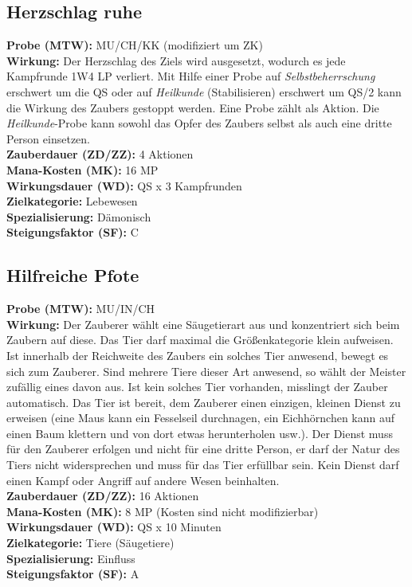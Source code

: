 \subsection{Herzschlag ruhe}
\label{chap:herzschlag_ruhe}
\textbf{Probe (MTW):} MU/CH/KK (modifiziert um ZK) \\
\textbf{Wirkung:} Der Herzschlag des Ziels wird ausgesetzt, wodurch es jede Kampfrunde 1W4 LP verliert. Mit Hilfe einer Probe auf \textit{Selbstbeherrschung} erschwert um die QS oder auf \textit{Heilkunde} (Stabilisieren) erschwert um QS/2 kann die Wirkung des Zaubers gestoppt werden. Eine Probe zählt als Aktion. Die \textit{Heilkunde}-Probe kann sowohl das Opfer des Zaubers selbst als auch eine dritte Person einsetzen.\\
\textbf{Zauberdauer (ZD/ZZ):} 4 Aktionen \\
\textbf{Mana-Kosten (MK):} 16 MP \\
\textbf{Wirkungsdauer (WD):} QS x 3 Kampfrunden \\
\textbf{Zielkategorie:} Lebewesen \\
\textbf{Spezialisierung:} Dämonisch \\
\textbf{Steigungsfaktor (SF):} C


\subsection{Hilfreiche Pfote}
\label{chap:hilfreiche_pfote}
\textbf{Probe (MTW):} MU/IN/CH \\
\textbf{Wirkung:} Der Zauberer wählt eine Säugetierart aus und konzentriert sich beim Zaubern auf diese. Das Tier darf maximal die Größenkategorie klein aufweisen. Ist innerhalb der Reichweite des Zaubers ein solches Tier anwesend, bewegt es sich zum Zauberer. Sind mehrere Tiere dieser Art anwesend, so wählt der Meister zufällig eines davon aus. Ist kein solches Tier vorhanden, misslingt der Zauber automatisch. Das Tier ist bereit, dem Zauberer einen einzigen, kleinen Dienst zu erweisen (eine Maus kann ein Fesselseil durchnagen, ein Eichhörnchen kann auf einen Baum klettern und von dort etwas herunterholen usw.). Der Dienst muss für den Zauberer erfolgen und nicht für eine dritte Person, er darf der Natur des Tiers nicht widersprechen und muss für das Tier erfüllbar sein. Kein Dienst darf einen Kampf oder Angriff auf andere Wesen beinhalten.\\
\textbf{Zauberdauer (ZD/ZZ):} 16 Aktionen \\
\textbf{Mana-Kosten (MK):} 8 MP (Kosten sind nicht modifizierbar) \\
\textbf{Wirkungsdauer (WD):} QS x 10 Minuten \\
\textbf{Zielkategorie:} Tiere (Säugetiere) \\
\textbf{Spezialisierung:} Einfluss \\
\textbf{Steigungsfaktor (SF):} A


